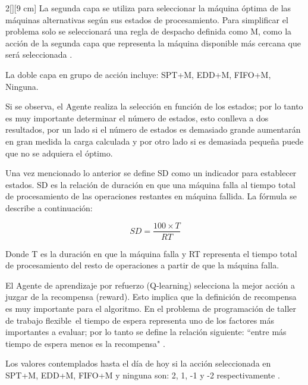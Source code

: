 \documentclass[letterpaper, 10 pt]{article}
\newcommand{\fjsp}{problema de programación de taller de trabajo flexible}
\begin{document}
\begin{multicols}{2}[][9 cm]
La segunda capa se utiliza para seleccionar la máquina óptima de las máquinas alternativas según sus estados de procesamiento. Para simplificar el problema solo se seleccionará una regla de despacho definida como M, como la acción de la segunda capa que representa la máquina disponible más cercana que será seleccionada \citep{zhao2019improved}. 

La doble capa en grupo de acción incluye: SPT+M, EDD+M, FIFO+M, Ninguna.

Si se observa, el Agente realiza la selección en función de los estados; por lo tanto es muy importante determinar el número de estados, esto conlleva a dos resultados, por un lado si el número de estados es demasiado grande aumentarán en gran medida la carga calculada y por otro lado si es demasiada pequeña puede que no se adquiera el óptimo.

Una vez mencionado lo anterior se define SD como un indicador para establecer estados. SD es la relación de duración en que una máquina falla al tiempo total de procesamiento de las operaciones restantes en máquina fallida. La fórmula se describe a continuación:

\begin{equation}
	SD = \dfrac{100 \times T}{RT}
\end{equation}

Donde T es la duración en que la máquina falla y RT representa el tiempo total de procesamiento del resto de operaciones a partir de que la máquina falla. 

El Agente de aprendizaje por refuerzo (Q-learning) selecciona la mejor acción a juzgar de la recompensa (reward). Esto implica que la definición de recompensa es muy importante para el algoritmo. En el \fjsp \, el tiempo de espera representa uno de los factores más importantes a evaluar; por lo tanto se define la relación siguiente: ``entre más tiempo de espera menos es la recompensa" \citep{zhao2019improved}.

Los valores contemplados hasta el día de hoy si la acción seleccionada en SPT+M, EDD+M, FIFO+M y ninguna son: 2, 1, -1 y -2 respectivamente \citep{zhao2019improved}. 


\end{multicols}
\end{document}
